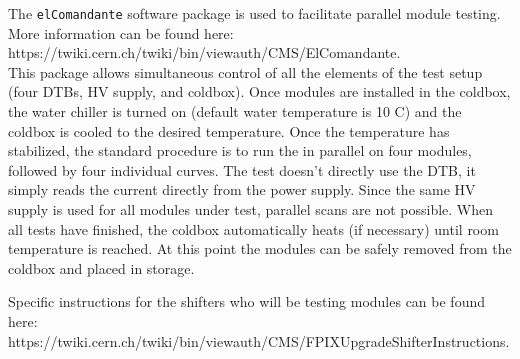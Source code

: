 The {\tt elComandante} software package is used to facilitate parallel module testing.
More information can be found here: 
\\
https://twiki.cern.ch/twiki/bin/viewauth/CMS/ElComandante.
\\
This package allows simultaneous control of all the elements of the test setup (four DTBs, HV supply, and coldbox).
Once modules are installed in the coldbox, 
the water chiller is turned on (default water temperature is 10 C) and the coldbox is cooled to the desired temperature.
Once the temperature has stabilized, 
the standard procedure is to run the \fulltest in parallel on four modules, followed by four individual \iv curves.
The \iv test doesn't directly use the DTB, it simply reads the current directly from the power supply.
Since the same HV supply is used for all modules under test, parallel \iv scans are not possible.
When all tests have finished, the coldbox automatically heats (if necessary) until room temperature is reached.
At this point the modules can be safely removed from the coldbox and placed in storage.

Specific instructions for the shifters who will be testing modules can be found here:
\\
https://twiki.cern.ch/twiki/bin/viewauth/CMS/FPIXUpgradeShifterInstructions.

